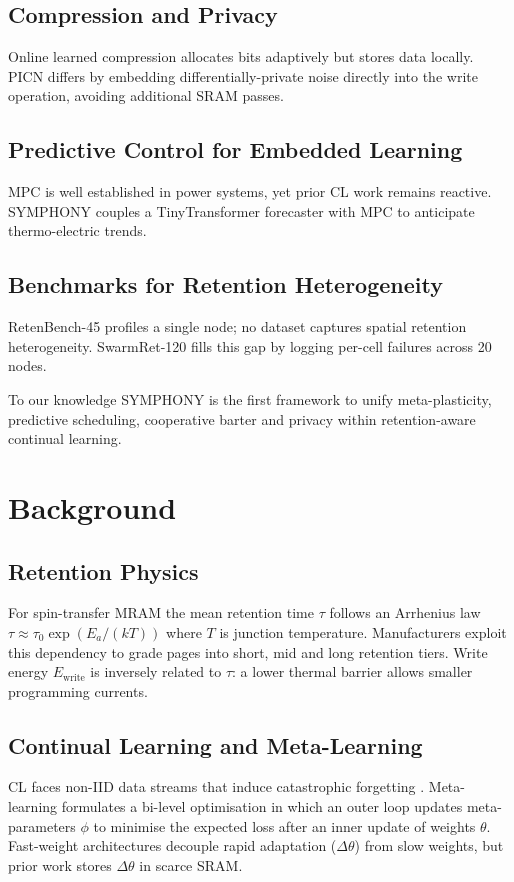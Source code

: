 \documentclass{article}
\begin{document}
\subsection{Compression and Privacy}
Online learned compression allocates bits adaptively \cite{caccia-2019-online} but stores data locally. PICN differs by embedding differentially-private noise directly into the write operation, avoiding additional SRAM passes.

\subsection{Predictive Control for Embedded Learning}
MPC is well established in power systems, yet prior CL work remains reactive. SYMPHONY couples a TinyTransformer forecaster with MPC to anticipate thermo-electric trends.

\subsection{Benchmarks for Retention Heterogeneity}
RetenBench-45 profiles a single node; no dataset captures spatial retention heterogeneity. SwarmRet-120 fills this gap by logging per-cell failures across 20 nodes.

To our knowledge SYMPHONY is the first framework to unify meta-plasticity, predictive scheduling, cooperative barter and privacy within retention-aware continual learning.

\section{Background}
\subsection{Retention Physics}
For spin-transfer MRAM the mean retention time \(\tau\) follows an Arrhenius law \(\tau \approx \tau_{0} \exp( E_{a} / (k T) )\) where \(T\) is junction temperature. Manufacturers exploit this dependency to grade pages into short, mid and long retention tiers. Write energy \(E_{\text{write}}\) is inversely related to \(\tau\): a lower thermal barrier allows smaller programming currents.

\subsection{Continual Learning and Meta-Learning}
CL faces non-IID data streams that induce catastrophic forgetting \cite{kirkpatrick-2016-overcoming}. Meta-learning formulates a bi-level optimisation in which an outer loop updates meta-parameters \(\phi\) to minimise the expected loss after an inner update of weights \(\theta\). Fast-weight architectures decouple rapid adaptation (\(\Delta \theta\)) from slow weights, but prior work stores \(\Delta \theta\) in scarce SRAM.
\end{document}
